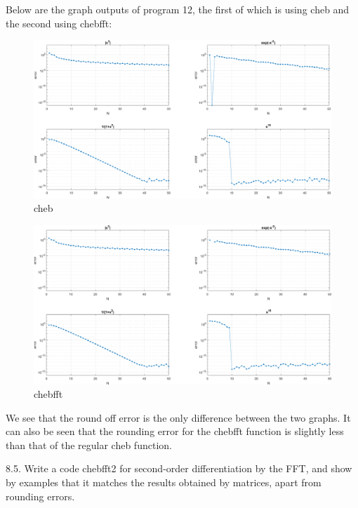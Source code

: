 \documentclass[12pt]{article}
\begin{document}
Below are the graph outputs of program 12, the first of which is using cheb and the second using chebfft:\\

\begin{figure}[htp]
\centering
\includegraphics[scale=0.14]{8_3cheb.PNG}
\caption{cheb}
\end{figure}
\begin{figure}[htp]
\centering
\includegraphics[scale=0.14]{8_3chebfft.PNG}
\caption{chebfft}
\end{figure}

We see that the round off error is the only difference between the two graphs. It can also be seen that the rounding error for the chebfft function is slightly less than that of the regular cheb function.

\newpage

\newpage

8.5. Write a code chebfft2 for second-order differentiation by the FFT, and show by examples that it matches the results obtained by matrices, apart from rounding errors.\\\\
\end{document}
